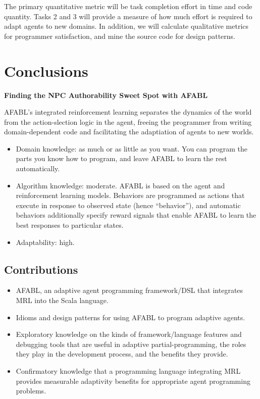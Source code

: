 The primary quantitative metric will be task completion effort in time and code quantity.  Tasks 2 and 3 will provide a measure of how much effort is required to adapt agents to new domains.  In addition, we will calculate qualitative metrics for programmer satisfaction, and mine the source code for design patterns.


\section{Conclusions}

{\bf Finding the NPC Authorability Sweet Spot with AFABL}

AFABL's integrated reinforcement learning separates the dynamics of the world from the action-slection logic in the agent, freeing the programmer from writing domain-dependent code and facilitating the adaptiation of agents to new worlds.

\begin{itemize}
\item Domain knowledge: as much or as little as you want.  You can program the parts you know how to program, and leave AFABL to learn the rest automatically.
\item Algorithm knowledge: moderate.  AFABL is based on the agent and
  reinforcement learning models.  Behaviors are programmed as actions
  that execute in response to observed state (hence ``behavior''), and
  automatic behaviors additionally specify reward signals that enable
  AFABL to learn the best responses to particular states.
\item Adaptability: high.
\end{itemize}


\subsection{Contributions}

\begin{itemize}
\item AFABL, an adaptive agent programming framework/DSL that integrates MRL into the Scala language.
\item Idioms and design patterns for using AFABL to program adaptive agents.
\item Exploratory knowledge on the kinds of framework/language features and debugging tools that are useful in adaptive partial-programming, the roles they play in the development process, and the benefits they provide.
\item Confirmatory knowledge that a programming language integrating MRL provides measurable adaptivity benefits for appropriate agent programming problems.
\end{itemize}
